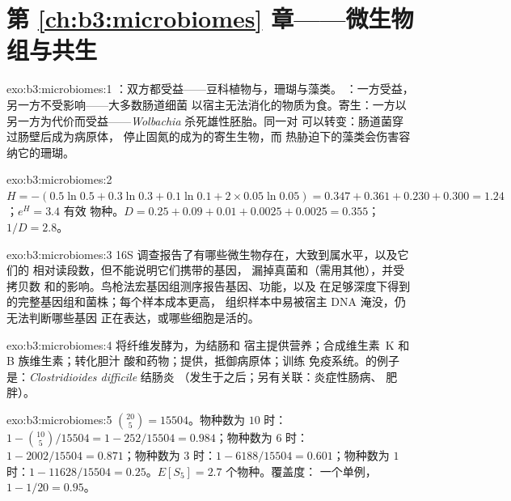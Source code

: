 \section*{第 \ref{ch:b3:microbiomes} 章——微生物组与共生}

\begin{solution}{exo:b3:microbiomes:1}
：双方都受益——豆科植物与，珊瑚与藻类。
：一方受益，另一方不受影响——大多数肠道细菌
以宿主无法消化的物质为食。寄生：一方以
另一方为代价而受益——\emph{Wolbachia} 杀死雄性胚胎。同一对
可以转变：肠道菌穿过肠壁后成为病原体，
停止固氮的成为的寄生生物，而
热胁迫下的藻类会伤害容纳它的珊瑚。
\end{solution}

\begin{solution}{exo:b3:microbiomes:2}
$H = -(0.5\ln 0.5 + 0.3\ln 0.3 + 0.1\ln 0.1 + 2\times 0.05\ln 0.05) =
0.347 + 0.361 + 0.230 + 0.300 = 1.24$；$e^{H} = 3.4$ 有效
物种。$D = 0.25 + 0.09 + 0.01 + 0.0025 + 0.0025 = 0.355$；$1/D =
2.8$。
\end{solution}

\begin{solution}{exo:b3:microbiomes:3}
16S 调查报告了有哪些微生物存在，大致到属水平，以及它们的
相对读段数，但不能说明它们携带的基因，
漏掉真菌和（需用其他），并受拷贝数
和的影响。鸟枪法宏基因组测序报告基因、功能，以及
在足够深度下得到的完整基因组和菌株；每个样本成本更高，
组织样本中易被宿主 DNA 淹没，仍无法判断哪些基因
正在表达，或哪些细胞是活的。
\end{solution}

\begin{solution}{exo:b3:microbiomes:4}
将纤维发酵为，为结肠和
宿主提供营养；合成维生素~K 和 B 族维生素；转化胆汁
酸和药物；提供，抵御病原体；训练
免疫系统。的例子是：\emph{Clostridioides difficile} 结肠炎
（发生于之后；另有关联：炎症性肠病、
肥胖）。
\end{solution}

\begin{solution}{exo:b3:microbiomes:5}
$\binom{20}{5} = \num{15504}$。物种数为 $10$ 时：$1 - \binom{10}{5}/
\num{15504} = 1 - 252/\num{15504} = 0.984$；物种数为 $6$ 时：$1 - 2002/\num{15504}
= 0.871$；物种数为 $3$ 时：$1 - 6188/\num{15504} = 0.601$；物种数为 $1$ 时：$1 -
\num{11628}/\num{15504} = 0.25$。$E[S_{5}] = 2.7$ 个物种。覆盖度：
一个单例，$1 - 1/20 = 0.95$。
\end{solution}


